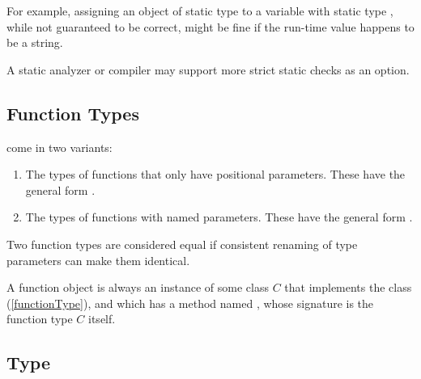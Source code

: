 \documentclass[makeidx]{article}
\begin{document}
{{For example, assigning an object of static type 
to a variable with static type ,
while not guaranteed to be correct,
might be fine if the run-time value happens to be a string.

A static analyzer or compiler
may support more strict static checks as an option.%
}


\subsection{Function Types}

\LMHash{}%
come in two variants:
\begin{enumerate}
\item
  The types of functions that only have positional parameters.
  These have the general form
  .
\item
  The types of functions with named parameters.
  These have the general form
  .
\end{enumerate}


\LMHash{}%
Two function types are considered equal if consistent renaming of type
parameters can make them identical.


\LMHash{}%
A function object is always an instance of some class $C$ that implements
the class \FUNCTION{} (\ref{functionType}),
and which has a method named \CALL,
whose signature is the function type $C$ itself.


\subsection{Type \FUNCTION}

}
\end{document}
